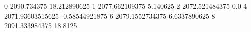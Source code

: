 0 2090.734375 18.212890625
1 2077.662109375 5.140625
2 2072.521484375 0.0
4 2071.93603515625 -0.58544921875
6 2079.1552734375 6.6337890625
8 2091.333984375 18.8125
